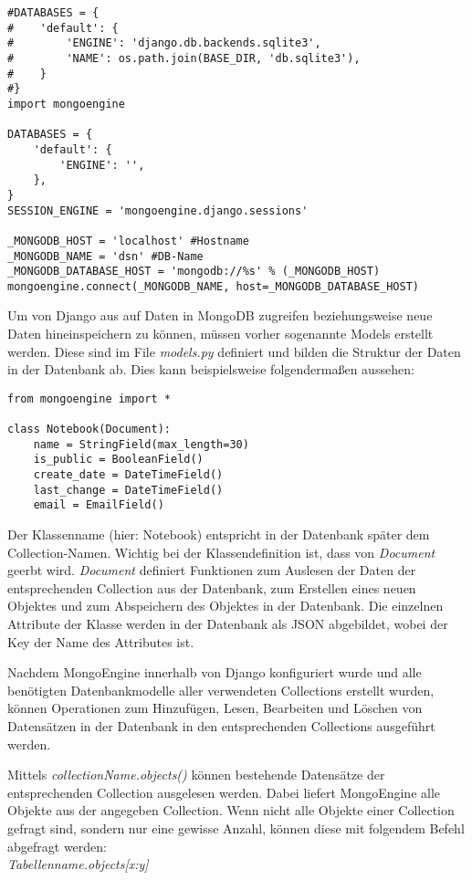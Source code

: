 \begin{lstlisting}[caption=MongoDB Konfiguration in Django]
#DATABASES = {
#    'default': {
#        'ENGINE': 'django.db.backends.sqlite3',
#        'NAME': os.path.join(BASE_DIR, 'db.sqlite3'),
#    }
#}
import mongoengine

DATABASES = {
    'default': {
        'ENGINE': '',
    },
}
SESSION_ENGINE = 'mongoengine.django.sessions'

_MONGODB_HOST = 'localhost' #Hostname
_MONGODB_NAME = 'dsn' #DB-Name
_MONGODB_DATABASE_HOST = 'mongodb://%s' % (_MONGODB_HOST)
mongoengine.connect(_MONGODB_NAME, host=_MONGODB_DATABASE_HOST)
\end{lstlisting}

Um von Django aus auf Daten in MongoDB zugreifen beziehungsweise neue Daten hineinspeichern zu können, müssen vorher sogenannte Models erstellt werden. Diese sind im File \textit{models.py} definiert und bilden die Struktur der Daten in der Datenbank ab. Dies kann beispielsweise folgendermaßen aussehen:

\begin{lstlisting}[caption=Beispiel für ein Datenbankmodell in Django]
from mongoengine import *

class Notebook(Document):
    name = StringField(max_length=30)
    is_public = BooleanField()
    create_date = DateTimeField()
    last_change = DateTimeField()
    email = EmailField()
\end{lstlisting}

Der Klassenname (hier: Notebook) entspricht in der Datenbank später dem Collection-Namen. Wichtig bei der Klassendefinition ist, dass von \textit{Document} geerbt wird. \textit{Document} definiert Funktionen zum Auslesen der Daten der entsprechenden Collection aus der Datenbank, zum Erstellen eines neuen Objektes und zum Abspeichern des Objektes in der Datenbank. Die einzelnen Attribute der Klasse werden in der Datenbank als JSON abgebildet, wobei der Key der Name des Attributes ist.

Nachdem MongoEngine innerhalb von Django konfiguriert wurde und alle benötigten Datenbankmodelle aller verwendeten Collections erstellt wurden, können Operationen zum Hinzufügen, Lesen, Bearbeiten und Löschen von Datensätzen in der Datenbank in den entsprechenden Collections ausgeführt werden.

Mittels \textit{collectionName.objects()} können bestehende Datensätze der entsprechenden Collection ausgelesen werden. Dabei liefert MongoEngine alle Objekte aus der angegeben Collection. Wenn nicht alle Objekte einer Collection gefragt sind, sondern nur eine gewisse Anzahl, können diese mit folgendem Befehl abgefragt werden:\\
\textit{Tabellenname.objects[x:y]}

